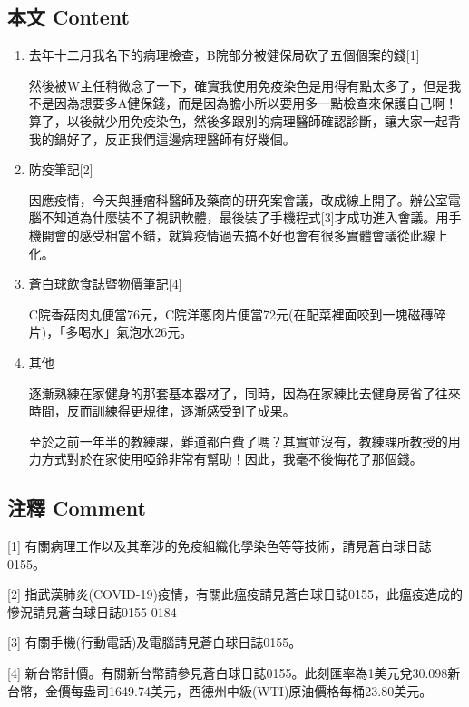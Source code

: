 \documentclass[a5paper, 11pt
]{book}
\begin{document}
\hypertarget{ux672cux6587-content-38}{%
\subsection{本文 Content}\label{ux672cux6587-content-38}}

\begin{enumerate}
\def\labelenumi{\arabic{enumi}.}
\item
  去年十二月我名下的病理檢查，B院部分被健保局砍了五個個案的錢{[}1{]}

  然後被W主任稍微念了一下，確實我使用免疫染色是用得有點太多了，但是我不是因為想要多A健保錢，而是因為膽小所以要用多一點檢查來保護自己啊！算了，以後就少用免疫染色，然後多跟別的病理醫師確認診斷，讓大家一起背我的鍋好了，反正我們這邊病理醫師有好幾個。
\item
  防疫筆記{[}2{]}

  因應疫情，今天與腫瘤科醫師及藥商的研究案會議，改成線上開了。辦公室電腦不知道為什麼裝不了視訊軟體，最後裝了手機程式{[}3{]}才成功進入會議。用手機開會的感受相當不錯，就算疫情過去搞不好也會有很多實體會議從此線上化。
\item
  蒼白球飲食誌暨物價筆記{[}4{]}

  C院香菇肉丸便當76元，C院洋蔥肉片便當72元(在配菜裡面咬到一塊磁磚碎片)，「多喝水」氣泡水26元。
\item
  其他

  逐漸熟練在家健身的那套基本器材了，同時，因為在家練比去健身房省了往來時間，反而訓練得更規律，逐漸感受到了成果。

  至於之前一年半的教練課，難道都白費了嗎？其實並沒有，教練課所教授的用力方式對於在家使用啞鈴非常有幫助！因此，我毫不後悔花了那個錢。
\end{enumerate}

\hypertarget{ux6ce8ux91cb-comment-38}{%
\subsection{注釋 Comment}\label{ux6ce8ux91cb-comment-38}}

{[}1{]}
有關病理工作以及其牽涉的免疫組織化學染色等等技術，請見蒼白球日誌0155。

{[}2{]}
指武漢肺炎(COVID-19)疫情，有關此瘟疫請見蒼白球日誌0155，此瘟疫造成的慘況請見蒼白球日誌0155-0184

{[}3{]} 有關手機(行動電話)及電腦請見蒼白球日誌0155。

{[}4{]}
新台幣計價。有關新台幣請參見蒼白球日誌0155。此刻匯率為1美元兌30.098新台幣，金價每盎司1649.74美元，西德州中級(WTI)原油價格每桶23.80美元。
\end{document}
